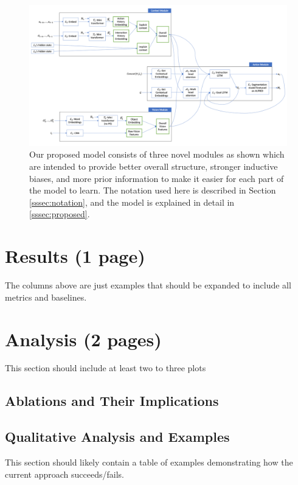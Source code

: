 \documentclass[11pt,a4paper]{article}
\begin{document}
\begin{figure}
    \centering
    \includegraphics[scale=0.4]{figures/our_model.png}
    \caption{Our proposed model consists of three novel modules as shown which are intended to provide better overall structure, stronger inductive biases, and more prior information to make it easier for each part of the model to learn. The notation used here is described in Section \ref{sssec:notation}, and the model is explained in detail in \ref{sssec:proposed}.}
    \label{fig:model}
\end{figure}


\clearpage

\section{Results (1 page)}
The columns above are just examples that should be expanded to include all metrics and baselines.

\clearpage
\section{Analysis (2 pages)}
This section should include at least two to three plots
\subsection{Ablations and Their Implications}

\subsection{Qualitative Analysis and Examples}
This section should likely contain a table of examples demonstrating how the current approach succeeds/fails.



\end{document}

